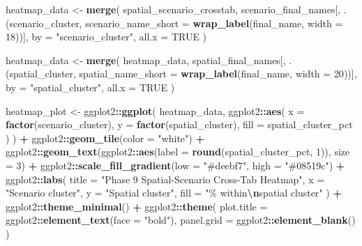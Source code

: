 \documentclass[
]{article}
\newenvironment{Shaded}{\begin{snugshade}}{\end{snugshade}}
\newcommand{\AttributeTok}[1]{\textcolor[rgb]{0.13,0.29,0.53}{#1}}
\newcommand{\ConstantTok}[1]{\textcolor[rgb]{0.56,0.35,0.01}{#1}}
\newcommand{\DecValTok}[1]{\textcolor[rgb]{0.00,0.00,0.81}{#1}}
\newcommand{\FunctionTok}[1]{\textcolor[rgb]{0.13,0.29,0.53}{\textbf{#1}}}
\newcommand{\NormalTok}[1]{#1}
\newcommand{\OtherTok}[1]{\textcolor[rgb]{0.56,0.35,0.01}{#1}}
\newcommand{\SpecialCharTok}[1]{\textcolor[rgb]{0.81,0.36,0.00}{\textbf{#1}}}
\newcommand{\StringTok}[1]{\textcolor[rgb]{0.31,0.60,0.02}{#1}}
\begin{document}
\begin{Shaded}
\begin{Highlighting}[]
\NormalTok{heatmap\_data }\OtherTok{\textless{}{-}} \FunctionTok{merge}\NormalTok{(}
\NormalTok{  spatial\_scenario\_crosstab,}
\NormalTok{  scenario\_final\_names[, .(scenario\_cluster, }\AttributeTok{scenario\_name\_short =} \FunctionTok{wrap\_label}\NormalTok{(final\_name, }\AttributeTok{width =} \DecValTok{18}\NormalTok{))],}
  \AttributeTok{by =} \StringTok{"scenario\_cluster"}\NormalTok{,}
  \AttributeTok{all.x =} \ConstantTok{TRUE}
\NormalTok{)}

\NormalTok{heatmap\_data }\OtherTok{\textless{}{-}} \FunctionTok{merge}\NormalTok{(}
\NormalTok{  heatmap\_data,}
\NormalTok{  spatial\_final\_names[, .(spatial\_cluster, }\AttributeTok{spatial\_name\_short =} \FunctionTok{wrap\_label}\NormalTok{(final\_name, }\AttributeTok{width =} \DecValTok{20}\NormalTok{))],}
  \AttributeTok{by =} \StringTok{"spatial\_cluster"}\NormalTok{,}
  \AttributeTok{all.x =} \ConstantTok{TRUE}
\NormalTok{)}

\NormalTok{heatmap\_plot }\OtherTok{\textless{}{-}}\NormalTok{ ggplot2}\SpecialCharTok{::}\FunctionTok{ggplot}\NormalTok{(}
\NormalTok{  heatmap\_data,}
\NormalTok{  ggplot2}\SpecialCharTok{::}\FunctionTok{aes}\NormalTok{(}
    \AttributeTok{x =} \FunctionTok{factor}\NormalTok{(scenario\_cluster),}
    \AttributeTok{y =} \FunctionTok{factor}\NormalTok{(spatial\_cluster),}
    \AttributeTok{fill =}\NormalTok{ spatial\_cluster\_pct}
\NormalTok{  )}
\NormalTok{) }\SpecialCharTok{+}
\NormalTok{  ggplot2}\SpecialCharTok{::}\FunctionTok{geom\_tile}\NormalTok{(}\AttributeTok{color =} \StringTok{"white"}\NormalTok{) }\SpecialCharTok{+}
\NormalTok{  ggplot2}\SpecialCharTok{::}\FunctionTok{geom\_text}\NormalTok{(ggplot2}\SpecialCharTok{::}\FunctionTok{aes}\NormalTok{(}\AttributeTok{label =} \FunctionTok{round}\NormalTok{(spatial\_cluster\_pct, }\DecValTok{1}\NormalTok{)), }\AttributeTok{size =} \DecValTok{3}\NormalTok{) }\SpecialCharTok{+}
\NormalTok{  ggplot2}\SpecialCharTok{::}\FunctionTok{scale\_fill\_gradient}\NormalTok{(}\AttributeTok{low =} \StringTok{"\#deebf7"}\NormalTok{, }\AttributeTok{high =} \StringTok{"\#08519c"}\NormalTok{) }\SpecialCharTok{+}
\NormalTok{  ggplot2}\SpecialCharTok{::}\FunctionTok{labs}\NormalTok{(}
    \AttributeTok{title =} \StringTok{"Phase 9 Spatial{-}Scenario Cross{-}Tab Heatmap"}\NormalTok{,}
    \AttributeTok{x =} \StringTok{"Scenario cluster"}\NormalTok{,}
    \AttributeTok{y =} \StringTok{"Spatial cluster"}\NormalTok{,}
    \AttributeTok{fill =} \StringTok{"\% within}\SpecialCharTok{\textbackslash{}n}\StringTok{spatial cluster"}
\NormalTok{  ) }\SpecialCharTok{+}
\NormalTok{  ggplot2}\SpecialCharTok{::}\FunctionTok{theme\_minimal}\NormalTok{() }\SpecialCharTok{+}
\NormalTok{  ggplot2}\SpecialCharTok{::}\FunctionTok{theme}\NormalTok{(}
    \AttributeTok{plot.title =}\NormalTok{ ggplot2}\SpecialCharTok{::}\FunctionTok{element\_text}\NormalTok{(}\AttributeTok{face =} \StringTok{"bold"}\NormalTok{),}
    \AttributeTok{panel.grid =}\NormalTok{ ggplot2}\SpecialCharTok{::}\FunctionTok{element\_blank}\NormalTok{()}
\NormalTok{  )}


\end{Highlighting}
\end{Shaded}
\end{document}
